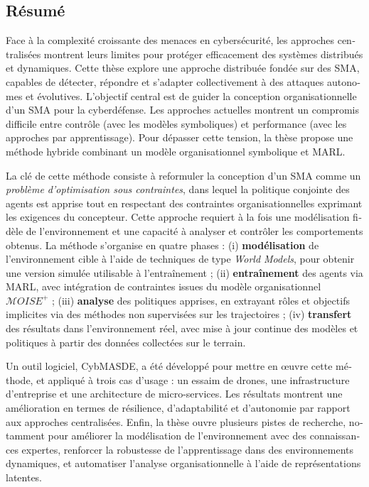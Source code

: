 \renewcommand{\abstractname}{Abstract}
\begingroup
\let\clearpage\relax
\let\cleardoublepage\relax
\let\cleardoublepage\relax

\begin{otherlanguage}{ngerman}
    \chapter*{Résumé}

    Face à la complexité croissante des menaces en cybersécurité, les approches centralisées montrent leurs limites pour protéger efficacement des systèmes distribués et dynamiques. Cette thèse explore une approche distribuée fondée sur des \ac{SMA}, capables de détecter, répondre et s'adapter collectivement à des attaques autonomes et évolutives.
    L'objectif central est de guider la conception organisationnelle d'un SMA pour la cyberdéfense. Les approches actuelles montrent un compromis difficile entre contrôle (avec les modèles symboliques) et performance (avec les approches par apprentissage). Pour dépasser cette tension, la thèse propose une méthode hybride combinant un modèle organisationnel symbolique et \ac{MARL}.

    La clé de cette méthode consiste à reformuler la conception d'un SMA comme un \textit{problème d'optimisation sous contraintes}, dans lequel la politique conjointe des agents est apprise tout en respectant des contraintes organisationnelles exprimant les exigences du concepteur. Cette approche requiert à la fois une modélisation fidèle de l'environn\-ement et une capacité à analyser et contrôler les comportements obtenus.
    La méthode s'organise en quatre phases : (i) \textbf{modélisation} de l'environnement cible à l'aide de techniques de type \textit{World Models}, pour obtenir une version simulée utilisable à l'entraînement ; (ii) \textbf{entraînement} des agents via MARL, avec intégration de contraintes issues du modèle organisationnel $\mathcal{M}OISE^+$ ; (iii) \textbf{analyse} des politiques apprises, en extrayant rôles et objectifs implicites via des méthodes non supervisées sur les trajectoires ; (iv) \textbf{transfert} des résultats dans l'environnement réel, avec mise à jour continue des modèles et politiques à partir des données collectées sur le terrain.

    Un outil logiciel, CybMASDE, a été développé pour mettre en œuvre cette méthode, et appliqué à trois cas d'usage : un essaim de drones, une infrastructure d'entreprise et une architecture de micro-services. Les résultats montrent une amélioration en termes de résilience, d'adaptabilité et d'autonomie par rapport aux approches centralisées.
    Enfin, la thèse ouvre plusieurs pistes de recherche, notamment pour améliorer la modélisation de l'environnement avec des connaissances expertes, renforcer la robustesse de l'apprentissage dans des environnements dynamiques, et automatiser l'analyse organisationnelle à l'aide de représentations latentes.


\end{otherlanguage}

